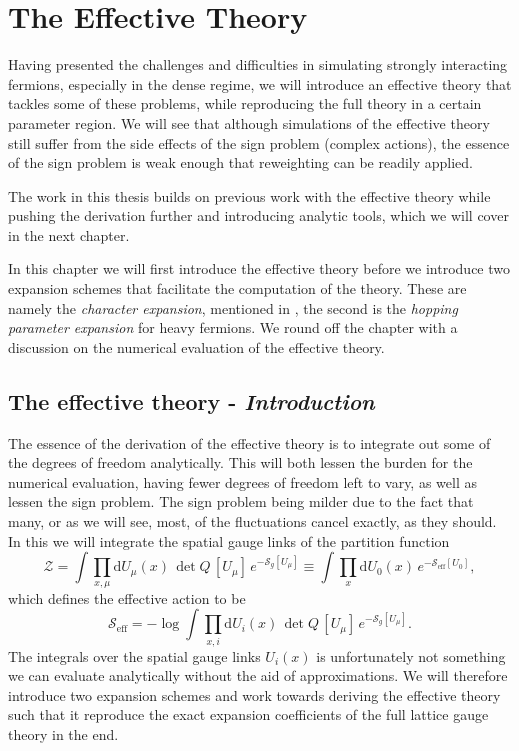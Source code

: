 \chapter{The Effective Theory} \label{chap4}

Having presented the challenges and difficulties in simulating strongly
interacting fermions, especially in the dense regime, we will introduce an
effective theory that tackles some of these problems, while reproducing the full
theory in a certain parameter region. We will see that although simulations of
the effective theory still suffer from the side effects of the sign problem
(complex actions), the essence of the sign problem is weak enough that
reweighting can be readily applied.

The work in this thesis builds on previous work with the effective theory while
pushing the derivation further and introducing analytic tools, which we will
cover in the next chapter.

In this chapter we will first introduce the effective theory before we introduce
two expansion schemes that facilitate the computation of the theory. These are
namely the \emph{character expansion}, mentioned in ,
the second is the \emph{hopping parameter expansion} for heavy fermions. We
round off the chapter with a discussion on the numerical evaluation of the
effective theory.

\section{The effective theory - \texorpdfstring{\itshape Introduction}{Introduction}}

The essence of the derivation of the effective theory is to integrate out some
of the degrees of freedom analytically. This will both lessen the burden for the
numerical evaluation, having fewer degrees of freedom left to vary, as well as
lessen the sign problem. The sign problem being milder due to the fact that
many, or as we will see, most, of the fluctuations cancel exactly, as they
should. In this we will integrate the spatial gauge links of the partition
function
%
\begin{equation}
  \mathcal{Z} = \int \prod_{x, \mu} \mathrm{d} U_{\mu}(x) \, \det Q \, [U_{\mu}] \,
    e^{-\mathcal{S}_g[U_{\mu}]}
    \equiv \int \prod_{x} \mathrm{d} U_0(x) \,
    e^{-\mathcal{S}_{\text{eff}}[U_0]},
\end{equation}
%
which defines the effective action to be
%
\begin{equation} \label{eq:eff_action_def}
  \mathcal{S}_{\text{eff}} = - \log \int \prod_{x, i} \mathrm{d} U_i(x) \, \det
    Q \, [U_{\mu}] \, e^{-\mathcal{S}_g [U_{\mu}]}.
\end{equation}
%
The integrals over the spatial gauge links $U_i(x)$ is unfortunately not
something we can evaluate analytically without the aid of approximations. We
will therefore introduce two expansion schemes and work towards deriving the
effective theory such that it reproduce the exact expansion coefficients of the
full lattice gauge theory in the end.

